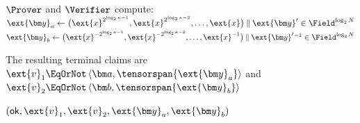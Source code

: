 \begin{algorithm}[!t]
\(\Prover\) and \(\Verifier\) compute:\\
\Indp
\(
    \ext{\bm y}_a
    \leftarrow
    \bigl(
        \ext{x}^{2^{\log_2\kappa-1}},
        \ext{x}^{2^{\log_2\kappa-2}},
        \ldots,
        \ext{x}
    \bigr)
    \mathbin{\|}
    \ext{\bm y}' \in \Field^{\log_2 N}
\)\;
\(
    \ext{\bm y}_b
    \leftarrow
    \bigl(
        \ext{x}^{-2^{\log_2\kappa-1}},
        \ext{x}^{-2^{\log_2\kappa-2}},
        \ldots,
        \ext{x}^{-1}
    \bigr)
    \mathbin{\|}
    \ext{\bm y}'{^{-1}} \in \Field^{\log_2 N}
\)\;
\Indm

The resulting terminal claims are
\(
    \ext{v}_1
    \EqOrNot
    \left\langle
        \bm a,
        \tensorspan{\ext{\bm y}_a}
    \right\rangle
\) and
\(
    \ext{v}_2
    \EqOrNot
    \left\langle
        \bm b,
        \tensorspan{\ext{\bm y}_b}
    \right\rangle
\)\;

\Return
\(
    (\mathsf{ok},\ext{v}_1,\ext{v}_2,\ext{\bm y}_a, \ext{\bm y}_b)
\)\;
\end{algorithm}